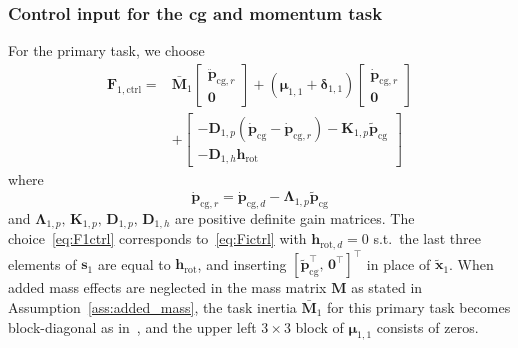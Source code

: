 \documentclass[../main.tex]{subfiles}
\begin{document}
\subsubsection{Control input for the \gls{cg} and momentum task}
For the primary task, we choose 
\begin{equation}\label{eq:F1ctrl}
    \begin{split}
        \bm{F}_{1,\textrm{ctrl}} ={}& \bar{\bm{M}}_1 \begin{bmatrix}
           \ddot{\bm{p}}_{\textrm{cg},r} \\ \bm{0}
       \end{bmatrix} + \left( \bm{\mu}_{1,1} + \bm{\delta}_{1,1} \right) \begin{bmatrix}
           \dot{\bm{p}}_{\textrm{cg},r} \\ \bm{0}
       \end{bmatrix}\\
       &+ \begin{bmatrix}
           -\bm{D}_{1,p} \left( \dot{\bm{p}}_{\textrm{cg}} - \dot{\bm{p}}_{\textrm{cg},r} \right) - \bm{K}_{1,p} \tilde{\bm{p}}_{\textrm{cg}} \\ -\bm{D}_{1,h} \bm{h}_{\textrm{rot}}
       \end{bmatrix}
    \end{split}
\end{equation}
where
\begin{equation}\label{eq:p_cgr}
    \dot{\bm{p}}_{\textrm{cg},r} = \dot{\bm{p}}_{\textrm{cg},d} - \bm{\Lambda}_{1,p} \tilde{\bm{p}}_{\textrm{cg}}
\end{equation}
and $\bm{\Lambda}_{1,p},\, \bm{K}_{1,p},\, \bm{D}_{1,p},\, \bm{D}_{1,h}$ are positive definite gain matrices.
The choice~\eqref{eq:F1ctrl} corresponds to~\eqref{eq:Fictrl} with $\bm{h}_{\textrm{rot},d} = 0$ s.t.~the last three elements of $\bm{s}_1$ are equal to $\bm{h}_{\textrm{rot}}$, and inserting $[\tilde{\bm{p}}_{\textrm{cg}}^\top,\, \bm{0}^\top]^\top$ in place of $\tilde{\bm{x}}_1$. When added mass effects are neglected in the mass matrix $\bm{M}$ as stated in Assumption~\ref{ass:added_mass}, the task inertia $\bar{\bm{M}}_1$ for this primary task becomes block-diagonal as in~\cite{Giordano2018}, and the upper left $3 \times 3$ block of $\bm{\mu}_{1,1}$ consists of zeros.
\end{document}
